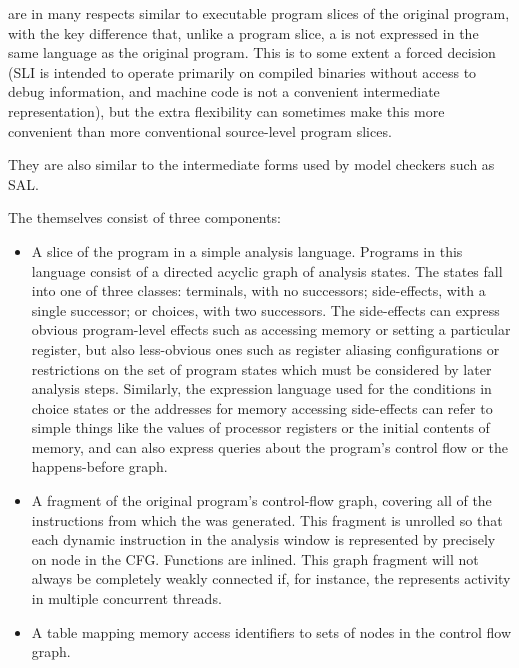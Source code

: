 \STateMachines are in many respects similar to executable program
slices of the original program, with the key difference that, unlike a
program slice, a \StateMachine is not expressed in the same language
as the original program.  This is to some extent a forced decision
(SLI is intended to operate primarily on compiled binaries without
access to debug information, and machine code is not a convenient
intermediate representation), but the extra flexibility can sometimes
make this more convenient than more conventional source-level program
slices.

They are also similar to the intermediate forms used by model checkers
such as SAL.

The \StateMachines themselves consist of three components:

\begin{itemize}
\item
  A slice of the program in a simple analysis language.  Programs in
  this language consist of a directed acyclic graph of analysis
  states.  The states fall into one of three classes: terminals, with
  no successors; side-effects, with a single successor; or choices,
  with two successors.  The side-effects can express obvious
  program-level effects such as accessing memory or setting a
  particular register, but also less-obvious ones such as register
  aliasing configurations or restrictions on the set of program states
  which must be considered by later analysis steps.  Similarly, the
  expression language used for the conditions in choice states or the
  addresses for memory accessing side-effects can refer to simple
  things like the values of processor registers or the initial
  contents of memory, and can also express queries about the program's
  control flow or the happens-before graph.
\item
  A fragment of the original program's control-flow graph, covering
  all of the instructions from which the \StateMachine was generated.
  This fragment is unrolled so that each dynamic instruction in the
  analysis window is represented by precisely on node in the
  CFG.  Functions are inlined.  This graph fragment
  will not always be completely weakly connected if, for instance, the
  \StateMachine represents activity in multiple concurrent threads.
\item
  A table mapping memory access identifiers to sets of nodes in the
  control flow graph. 
\end{itemize}

